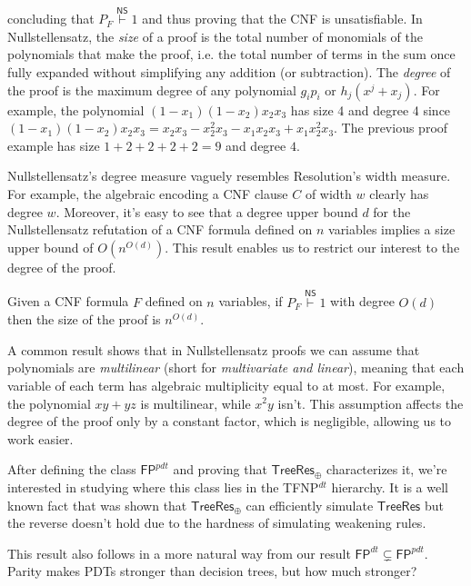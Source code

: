 concluding that $P_F \stackrel{\mathsf{NS}}{\vdash} 1$ and thus proving that the CNF is unsatisfiable. In Nullstellensatz, the \textit{size} of a proof is the total number of monomials of the polynomials that make the proof, i.e. the total number of terms in the sum once fully expanded without simplifying any addition (or subtraction). The \textit{degree} of the proof is the maximum degree of any polynomial $g_ip_i$ or $h_j(x^j+x_j)$. For example, the polynomial $(1-x_1)(1-x_2)x_2x_3$ has size 4 and degree 4 since $(1-x_1)(1-x_2)x_2x_3 = x_2x_3 - x_2^2x_3 - x_1x_2x_3 + x_1x_2^2x_3$. The previous proof example has size $1+2+2+2+2 = 9$ and degree $4$.

Nullstellensatz's degree measure vaguely resembles Resolution's width measure. For example, the algebraic encoding a CNF clause $C$ of width $w$ clearly has degree $w$. Moreover, it's easy to see that a degree upper bound $d$ for the Nullstellensatz refutation of a CNF formula defined on $n$ variables implies a size upper bound of $O(n^{O(d)})$. This result enables us to restrict our interest to the degree of the proof.

\begin{proposition}
    Given a CNF formula $F$ defined on $n$ variables, if $P_F \stackrel{\mathsf{NS}}{\vdash} 1$ with degree $O(d)$ then the size of the proof is $n^{O(d)}$.
\end{proposition}

A common result shows that in Nullstellensatz proofs we can assume that polynomials are \textit{multilinear} (short for \textit{multivariate and linear}), meaning that each variable of each term has algebraic multiplicity equal to at most. For example, the polynomial $xy+yz$ is multilinear, while $x^2y$ isn't. This assumption affects the degree of the proof only by a constant factor, which is negligible, allowing us to work easier.

After defining the class $\mathsf{FP}^{pdt}$ and proving that $\mathsf{TreeRes}_\oplus$ characterizes it, we're interested in studying where this class lies in the \textsf{TFNP}$^{dt}$ hierarchy. It is a well known fact that was shown that $\mathsf{TreeRes}_\oplus$ can efficiently simulate $\mathsf{TreeRes}$ but the reverse doesn't hold due to the hardness of simulating weakening rules. 

\newpage

This result also follows in a more natural way from our result $\mathsf{FP}^{dt} \subsetneq \mathsf{FP}^{pdt}$. Parity makes PDTs stronger than decision trees, but how much stronger?

